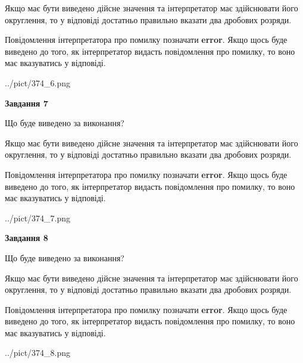 \documentclass[12pt, ukrainian]{article}
\begin{document}
{\begin {Large}
Якщо має бути виведено дійсне значення та інтерпретатор має здійснювати його округлення, 
то у відповіді достатньо правильно вказати два дробових розряди.

Повідомлення інтерпретатора про помилку позначати \textbf{error}.
Якщо щось буде виведено до того, як інтерпретатор видасть повідомлення про помилку, 
то воно має вказуватись у відповіді. \par

\begin{center}
	{../pict/374_6.png}
\end{center}
\newpage

{\begin {center}\textbf{Завдання 7}\end {center}}\par
Що буде виведено за виконання? \par

Якщо має бути виведено дійсне значення та інтерпретатор має здійснювати його округлення, 
то у відповіді достатньо правильно вказати два дробових розряди.

Повідомлення інтерпретатора про помилку позначати \textbf{error}.
Якщо щось буде виведено до того, як інтерпретатор видасть повідомлення про помилку, 
то воно має вказуватись у відповіді. \par

\begin{center}
	{../pict/374_7.png}
\end{center}
\newpage

{\begin {center}\textbf{Завдання 8}\end {center}}\par
Що буде виведено за виконання? \par

Якщо має бути виведено дійсне значення та інтерпретатор має здійснювати його округлення, 
то у відповіді достатньо правильно вказати два дробових розряди.

Повідомлення інтерпретатора про помилку позначати \textbf{error}.
Якщо щось буде виведено до того, як інтерпретатор видасть повідомлення про помилку, 
то воно має вказуватись у відповіді. \par

\begin{center}
	{../pict/374_8.png}
\end{center}
\newpage


\end{Large}}
\end{document}
